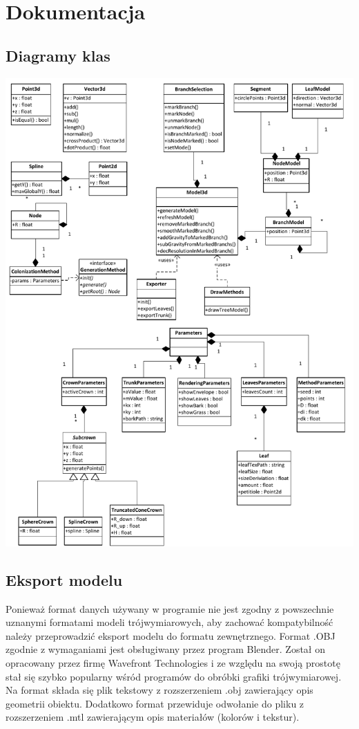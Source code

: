 \chapter{Dokumentacja}

\section{Diagramy klas}

\begin{center}
	\includegraphics[scale=0.55]{images/treemaker_uml}
	\label{treemaker_uml}
\end{center}

\section{Eksport modelu}
Ponieważ format danych używany w programie nie jest zgodny z powszechnie uznanymi formatami modeli trójwymiarowych, aby zachować kompatybilność należy przeprowadzić eksport modelu do 
formatu zewnętrznego. Format .OBJ zgodnie z wymaganiami jest obsługiwany przez program Blender.
Został on opracowany przez firmę Wavefront Technologies i ze względu na swoją prostotę stał się szybko
popularny wśród programów do obróbki grafiki trójwymiarowej. Na format składa się plik tekstowy z rozszerzeniem .obj 
zawierający opis geometrii obiektu. Dodatkowo format przewiduje odwołanie do pliku z rozszerzeniem .mtl zawierającym
opis materiałów (kolorów i tekstur).


